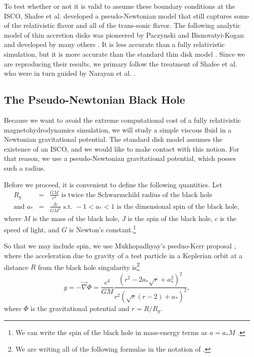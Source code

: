 \documentclass[]{article}
\newcommand{\myvec}[1]{\vec{#1}} %
\begin{document}
To test whether or not it is valid to assume these boundary conditions
at the ISCO, Shafee et al. developed a pseudo-Newtonian model that
still captures some of the relativistic flavor and all of the
trans-sonic flavor. The following analytic model of thin accretion
disks was pioneered by Paczynski and Bisnovatyi-Kogan \cite{PBK81} and
developed by many others
\cite{Shafee08,MuchotrzebPaczynski82,Kato88a,Abramowicz88,PophamNarayan91,NarayanPopham93,ChenTaam93,Narayan97,Chen97,AfshordiPaczynski03}. It
is less accurate than a fully relativistic simulation, but it is more
accurate than the standard thin disk model \cite{Shafee08}. Since we
are reproducing their results, we primary follow the treatment of
Shafee et al. \cite{Shafee08} who were in turn guided by Narayan et
al. \cite{Narayan97}.

\subsection{The Pseudo-Newtonian Black Hole}
\label{subsec:gravity}

Because we want to avoid the extreme computational cost of a fully
relativistic magnetohydrodynamics simulation, we will study a simple
viscous fluid in a Newtonian gravitational potential. The standard
disk model assumes the existence of an ISCO, and we would like to make
contact with this notion. For that reason, we use a pseudo-Newtonian
gravitational potential, which posses such a radius.

Before we proceed, it is convenient to define the following quantities. Let
\begin{eqnarray}
  \label{eq:convenient:definitions}
  R_g &=& \frac{GM}{c^2}\text{ is twice the Schwarzschild radius of the black hole}\\
  \text{and }a_* &=& \frac{J c}{G M^2}\text{ s.t. }-1<a_*<1\text{ is the dimensional spin of the black hole},
\end{eqnarray}
where $M$ is the mass of the black hole, $J$ is the spin of the black
hole, $c$ is the speed of light, and $G$ is Newton's
constant.\footnote{We can write the spin of the black hole in
  mass-energy terms as $a=a_* M$ \cite{Shafee08}.}

So that we may include spin, we use Mukhopadhyay's pseduo-Kerr
proposal \cite{Mukhopadhyay02}, where the acceleration due to gravity
of a test particle in a Keplerian orbit at a distance $R$ from the
black hole singularity is\footnote{We are writing all of the following
  formulas in the notation of \cite{Shafee08}.}
\begin{equation}
  \label{eq:mukhopadhyay:g}
  g = -\myvec{\nabla}\Phi = \frac{c^4}{GM} \frac{\left(r^2 - 2 a_* \sqrt{r} + a_*^2\right)^2}{r^2\left(\sqrt{r}(r-2)+a_*\right)^2},
\end{equation}
where $\Phi$ is the gravitational potential and $r=R/R_g$.
\end{document}
